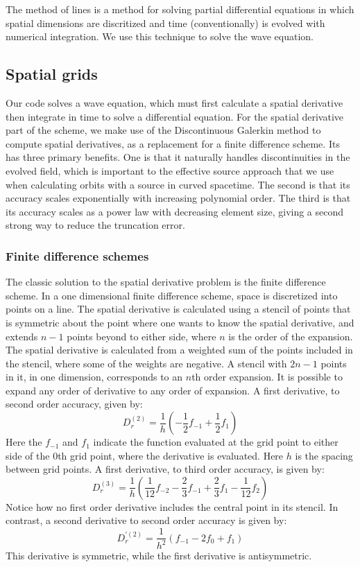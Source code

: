 The method of lines is a method for solving partial differential equations in which spatial dimensions are discritized and time (conventionally) is evolved with numerical integration. We use this technique to solve the wave equation. 

\subsection{Spatial grids}
Our code solves a wave equation, which must first calculate a spatial derivative then integrate in time to solve a differential equation. For the spatial derivative part of the scheme, we make use of the Discontinuous Galerkin method to compute spatial derivatives, as a replacement for a finite difference scheme. Its has three primary benefits. One is that it naturally handles discontinuities in the evolved field, which is important to the effective source approach that we use when calculating orbits with a source in curved spacetime. The second is that its accuracy scales exponentially with increasing polynomial order. The third is that its accuracy scales as a power law with decreasing element size, giving a second strong way to reduce the truncation error.


\subsubsection{Finite difference schemes}
The classic solution to the spatial derivative problem is the finite difference scheme. In a one dimensional finite difference scheme, space is discretized into points on a line. The spatial derivative is calculated using a stencil of points that is symmetric about the point where one wants to know the spatial derivative, and extends $n-1$ points beyond to either side, where $n$ is the order of the expansion. The spatial derivative is calculated from a weighted sum of the points included in the stencil, where some of the weights are negative. A stencil with $2n-1$ points in it, in one dimension, corresponds to an $n$th order expansion. It is possible to expand any order of derivative to any order of expansion. A first derivative, to second order accuracy, given by:
\begin{equation}
  D_r^{(2)}=\frac{1}{h}(-\frac{1}{2}f_{-1}+\frac{1}{2}f_1)
\end{equation}
Here the $f_{-1}$ and $f_1$ indicate the function evaluated at the grid point to either side of the $0$th grid point, where the derivative is evaluated. Here $h$ is the spacing between grid points. A first derivative, to third order accuracy, is given by:
\begin{equation}
  D_r^{(3)}=\frac{1}{h}(\frac{1}{12}f_{-2}-\frac{2}{3}f_{-1}+\frac{2}{3}f_1-\frac{1}{12}f_2)
\end{equation}
Notice how no first order derivative includes the central point in its stencil. In contrast, a second derivative to second order accuracy is given by:
\begin{equation}
  D_r^{\prime (2)}=\frac{1}{h^2}(f_{-1}-2f_0+f_1)
\end{equation}
This derivative is symmetric, while the first derivative is antisymmetric.

